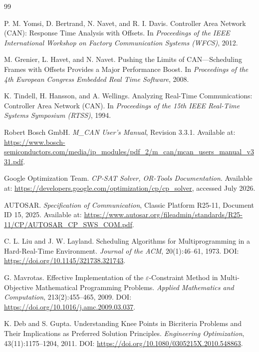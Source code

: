 \documentclass[UTF8,12pt,a4paper]{ctexart}
\begin{document}
\begin{thebibliography}{99}

P. M. Yomsi, D. Bertrand, N. Navet, and R. I. Davis.
Controller Area Network (CAN): Response Time Analysis with Offsets.
In \emph{Proceedings of the IEEE International Workshop on Factory Communication Systems (WFCS)}, 2012.

M. Grenier, L. Havet, and N. Navet.
Pushing the Limits of CAN---Scheduling Frames with Offsets Provides a Major Performance Boost.
In \emph{Proceedings of the 4th European Congress Embedded Real Time Software}, 2008.

K. Tindell, H. Hansson, and A. Wellings.
Analyzing Real-Time Communications: Controller Area Network (CAN).
In \emph{Proceedings of the 15th IEEE Real-Time Systems Symposium (RTSS)}, 1994.

Robert Bosch GmbH.
\emph{M\_CAN User's Manual}, Revision 3.3.1.
Available at: \url{https://www.bosch-semiconductors.com/media/ip_modules/pdf_2/m_can/mcan_users_manual_v331.pdf}.

Google Optimization Team.
\emph{CP-SAT Solver, OR-Tools Documentation}.
Available at: \url{https://developers.google.com/optimization/cp/cp_solver}, accessed July 2026.



AUTOSAR.
\emph{Specification of Communication}, Classic Platform R25-11, Document ID 15, 2025.
Available at: \url{https://www.autosar.org/fileadmin/standards/R25-11/CP/AUTOSAR_CP_SWS_COM.pdf}.

C. L. Liu and J. W. Layland.
Scheduling Algorithms for Multiprogramming in a Hard-Real-Time Environment.
\emph{Journal of the ACM}, 20(1):46--61, 1973.
DOI: \url{https://doi.org/10.1145/321738.321743}.

G. Mavrotas.
Effective Implementation of the $\varepsilon$-Constraint Method in Multi-Objective Mathematical Programming Problems.
\emph{Applied Mathematics and Computation}, 213(2):455--465, 2009.
DOI: \url{https://doi.org/10.1016/j.amc.2009.03.037}.

K. Deb and S. Gupta.
Understanding Knee Points in Bicriteria Problems and Their Implications as Preferred Solution Principles.
\emph{Engineering Optimization}, 43(11):1175--1204, 2011.
DOI: \url{https://doi.org/10.1080/0305215X.2010.548863}.

\end{thebibliography}
\end{document}
